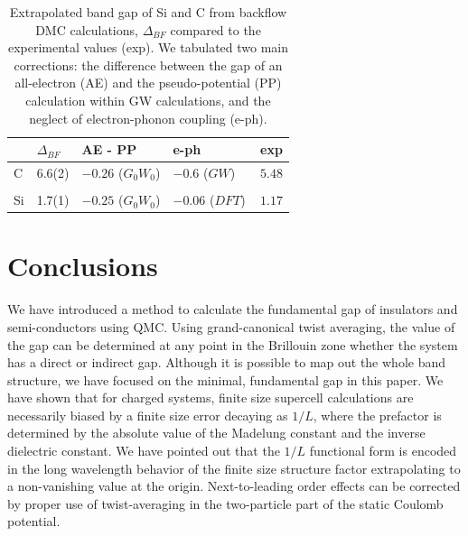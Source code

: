 \begin{table}
\caption{Extrapolated band gap
of Si and C from backflow DMC calculations, $\Delta_{BF}$
compared to the experimental values (exp).
We tabulated two main corrections:
the difference  between the gap of an all-electron (AE) and the pseudo-potential (PP)
calculation within GW calculations, and
the neglect of electron-phonon coupling (e-ph).
\label{tab:c-si-gap-corr}}
\begin{tabular}{lllll}
\hline\hline
& $\Delta_{BF}$ & AE - PP & e-ph  & exp \\
\hline
C & 6.6(2) &   $-0.26$ ($G_0W_0$) \cite{GomezAbal08} & $-0.6$ ($GW$)~~\cite{Giustino10} & $5.48$ \cite{exp}\\
\hline \\
Si &  1.7(1)  & $-0.25$ ($G_0W_0$)\cite{GomezAbal08}  & $-0.06$ ($DFT$) \cite{Monserrat14} & $1.17$ \cite{exp} \\
\hline\hline
\end{tabular}
\end{table}


\section{Conclusions}
\label{sec:bg-conclude}

We have introduced a method to calculate the fundamental gap of insulators and semi-conductors
using QMC. Using grand-canonical twist averaging, 
the value of the gap can be determined at any point in the Brillouin zone whether the system has a direct or indirect gap. Although it is 
possible to map out the whole band structure, we have focused on the minimal, fundamental gap
in this paper. We have shown that for charged systems, finite size supercell calculations
are necessarily biased by a finite size error decaying as $1/L$, where the prefactor
is determined by the absolute value of the Madelung constant and the inverse dielectric constant.
We have pointed out that the $1/L$ functional form is encoded in the long wavelength behavior of
the finite size structure factor extrapolating to a non-vanishing value at the origin.
Next-to-leading order effects can be corrected by proper use of twist-averaging in the
two-particle part of the static Coulomb potential. 

